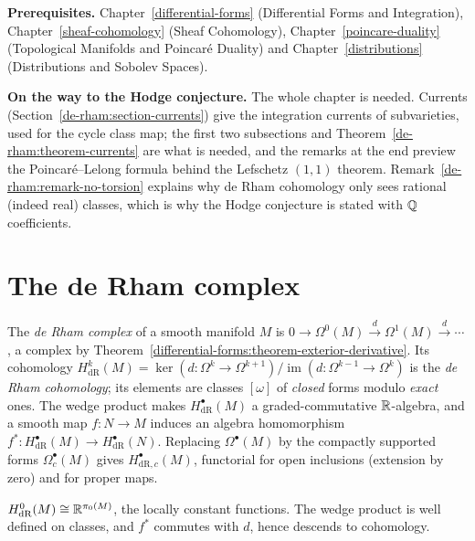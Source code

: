 \noindent\textbf{Prerequisites.} Chapter~\ref{differential-forms} (Differential Forms and Integration), Chapter~\ref{sheaf-cohomology}
(Sheaf Cohomology), Chapter~\ref{poincare-duality} (Topological Manifolds and Poincar\'e Duality) and Chapter~\ref{distributions}
(Distributions and Sobolev Spaces).

\noindent\textbf{On the way to the Hodge conjecture.} The whole chapter is needed. Currents (Section~\ref{de-rham:section-currents}) give the integration currents of subvarieties, used for the cycle class map; the first two subsections and
Theorem~\ref{de-rham:theorem-currents} are what is needed, and the remarks at the end preview the Poincar\'e--Lelong formula behind the Lefschetz $(1,1)$ theorem. Remark~\ref{de-rham:remark-no-torsion} explains why de Rham cohomology only sees rational (indeed real) classes, which is
why the Hodge conjecture is stated with $\mathbb{Q}$ coefficients.

\section{The de Rham complex}\label{de-rham:section-complex}

\begin{definition}\label{de-rham:definition-de-rham}
The \emph{de Rham complex} of a smooth manifold $M$ is $0 \to \Omega^0(M) \xrightarrow{d} \Omega^1(M) \xrightarrow{d} \cdots$, a complex by Theorem~\ref{differential-forms:theorem-exterior-derivative}. Its
cohomology $H^k_{\mathrm{dR}}(M) = \ker(d \colon \Omega^k \to \Omega^{k+1})/\operatorname{im}(d \colon \Omega^{k-1} \to \Omega^k)$ is the \emph{de Rham cohomology}; its elements are classes $[\omega]$ of
\emph{closed} forms modulo \emph{exact} ones. The wedge product makes $H^\bullet_{\mathrm{dR}}(M)$ a graded-commutative $\mathbb{R}$-algebra, and a smooth map $f \colon N \to M$ induces an algebra homomorphism
$f^* \colon H^\bullet_{\mathrm{dR}}(M) \to H^\bullet_{\mathrm{dR}}(N)$. Replacing $\Omega^\bullet(M)$ by the compactly supported forms $\Omega^\bullet_c(M)$ gives $H^\bullet_{\mathrm{dR},c}(M)$, functorial for
open inclusions (extension by zero) and for proper maps.
\end{definition}

\begin{proposition}\label{de-rham:proposition-h0}
$H^0_{\mathrm{dR}}(M) \cong \mathbb{R}^{\pi_0(M)}$, the locally constant functions. The wedge product is well defined on classes, and $f^*$ commutes with $d$, hence descends to cohomology.
\end{proposition}

